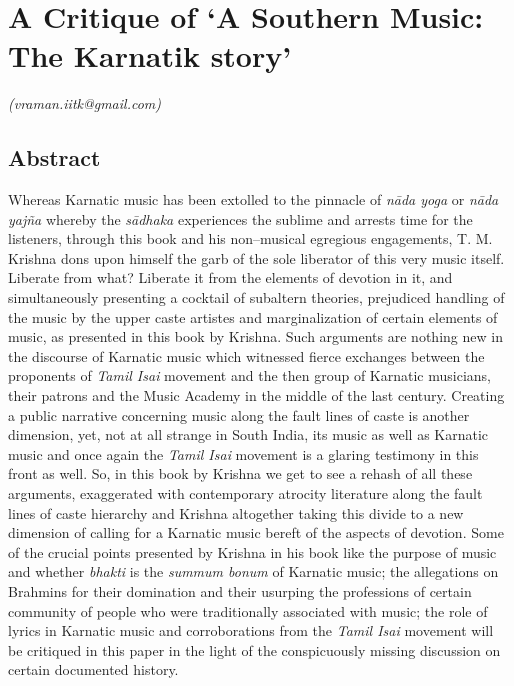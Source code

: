 
\chapter{A Critique of ‘A Southern Music: The Karnatik story’}\label{chapter6}


\begin{flushright}
\textit{(vraman.iitk@gmail.com)}
\end{flushright}

\vspace{-.5cm}

\section*{Abstract}

Whereas Karnatic music has been extolled to the pinnacle of \textit{nāda yoga} or \textit{nāda yajña} whereby the \textit{sādhaka} experiences the sublime and arrests time for the listeners, through this book and his non–musical egregious engagements, T. M. Krishna dons upon himself the garb of the sole liberator of this very music itself. Liberate from what? Liberate it from the elements of devotion in it, and simultaneously presenting a cocktail of subaltern theories, prejudiced handling of the music by the upper caste artistes and marginalization of certain elements of music, as presented in this book by Krishna. Such arguments are nothing new in the discourse of Karnatic music which witnessed fierce exchanges between the proponents of \textit{Tamil Isai} movement and the then group of Karnatic musicians, their patrons and the Music Academy in the middle of the last century. Creating a public narrative concerning music along the fault lines of caste is another dimension, yet, not at all strange in South India, its music as well as Karnatic music and once again the \textit{Tamil Isai} movement is a glaring testimony in this front as well. So, in this book by Krishna we get to see a rehash of all these arguments, exaggerated with contemporary atrocity literature along the fault lines of caste hierarchy and Krishna altogether taking this divide to a new dimension of calling for a Karnatic music bereft of the aspects of devotion. Some of the crucial points presented by Krishna in his book like the purpose of music and whether \textit{bhakti} is the \textit{summum bonum} of Karnatic music; the allegations on Brahmins for their domination and their usurping the professions of certain community of people who were traditionally associated with music; the role of lyrics in Karnatic music and corroborations from the \textit{Tamil Isai} movement will be critiqued in this paper in the light of the conspicuously missing discussion on certain documented history.

